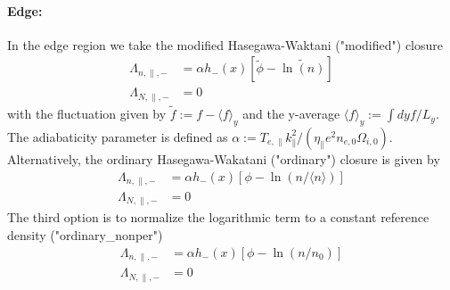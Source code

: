 \paragraph{Edge:} In the edge region we take the modified Hasegawa-Waktani ("modified")
closure~\cite{Held2018}
\begin{align}
 \Lambda_{n,\parallel,-} &= \alpha h_{-}(x) \left[\widetilde{\phi} - 
\widetilde{\ln(n)} \right] \\
 \Lambda_{N,\parallel,-} &= 0
\end{align}
with the fluctuation given by \(\widetilde{f} := f - \langle f\rangle_y\) and 
the y-average \(\langle f\rangle_y:= \int dy f / L_y\). The adiabaticity 
parameter is defined as \(\alpha := T_{e,\parallel} 
k_\parallel^2/(\eta_\parallel e^2 n_{e,0} \Omega_{i,0} )\).
\\
Alternatively, the ordinary Hasegawa-Wakatani ("ordinary") closure is given by~\cite{Held2018}
\begin{align}
 \Lambda_{n,\parallel,-} &= \alpha h_{-}(x) \left[\phi - 
\ln(n/\langle n\rangle) \right] \\
 \Lambda_{N,\parallel,-} &= 0
\end{align}
The third option is to normalize the logarithmic term to a constant reference density ("ordinary_nonper")
\begin{align}
 \Lambda_{n,\parallel,-} &= \alpha h_{-}(x) \left[\phi - 
\ln(n/n_0) \right] \\
 \Lambda_{N,\parallel,-} &= 0
\end{align}
